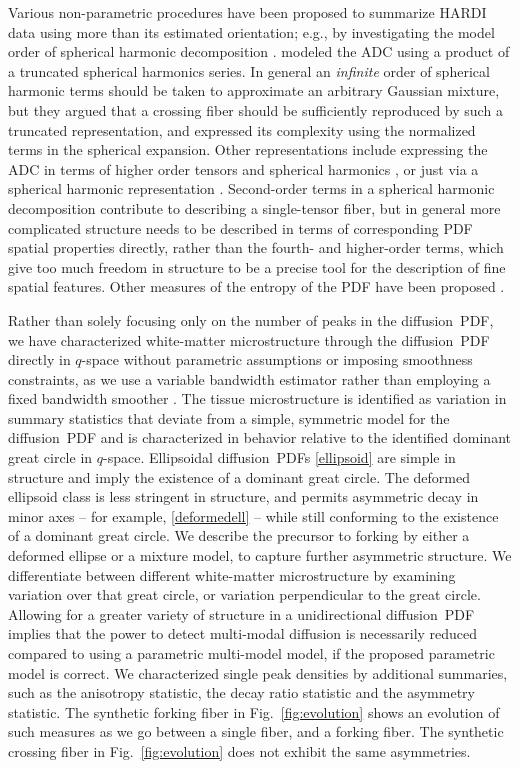 \documentclass[dvips,aoas,preprint]{imsart}
\numberwithin{equation}{section}
\theoremstyle{plain}
\begin{document}
Various non-parametric procedures have been proposed to summarize
HARDI data using more than its estimated orientation; e.g., by
investigating the model order of spherical harmonic decomposition
\citep{fra:characterization,ale-bar-arr:detection,Descoteaux:2006}.
\citet{chen2005} modeled the ADC using a product of a truncated
spherical harmonics series.  In general an {\em infinite} order of
spherical harmonic terms should be taken to approximate an arbitrary
Gaussian mixture, but they argued that a crossing fiber should be
sufficiently reproduced by such a truncated representation, and
expressed its complexity using the normalized terms in the spherical
expansion.  Other representations include expressing the ADC in terms
of higher order tensors and spherical harmonics
\citep{Descoteaux:2006}, or just via a spherical harmonic
representation \citep{fra:characterization}.
Second-order terms in a spherical harmonic decomposition contribute to
describing a single-tensor fiber, but in general more complicated
structure needs to be described in terms of corresponding PDF spatial
properties directly, rather than the fourth- and higher-order terms,
which give too much freedom in structure to be a precise tool for the
description of fine spatial features. Other measures of the entropy of
the PDF have been proposed \citep{rao2004}.

Rather than solely focusing only on the number of peaks in the
diffusion~PDF, we have characterized white-matter microstructure
through the diffusion~PDF directly in $q$-space without parametric
assumptions or imposing smoothness constraints, as we use a
variable bandwidth estimator rather than employing a fixed bandwidth
smoother \citep{OlhedeWhitcher}.  The tissue microstructure is
identified as variation in summary statistics that deviate from a
simple, symmetric model for the diffusion~PDF and is characterized in
behavior relative to the identified dominant great circle in
$q$-space.  Ellipsoidal diffusion~PDFs \eqref{ellipsoid} are simple in
structure and imply the existence of a dominant great circle.  The
deformed ellipsoid class is less stringent in structure, and permits
asymmetric decay in minor axes -- for example, \eqref{deformedell} --
while still conforming to the existence of a dominant great circle.
We describe the precursor to forking by either a deformed ellipse or a
mixture model, to capture further asymmetric structure.  We
differentiate between different white-matter microstructure by
examining variation over that great circle, or variation perpendicular
to the great circle.  Allowing for a greater variety of structure in a
unidirectional diffusion~PDF implies that the power to detect
multi-modal diffusion is necessarily reduced compared to using a
parametric multi-model model, if the proposed parametric model is
correct.  We characterized single peak densities by additional
summaries, such as the anisotropy statistic, the decay ratio statistic
and the asymmetry statistic.  The synthetic forking fiber in
Fig.~\ref{fig:evolution} shows an evolution of such measures as we go
between a single fiber, and a forking fiber.  The synthetic crossing
fiber in Fig.~\ref{fig:evolution} does not exhibit the same
asymmetries.
\end{document}
